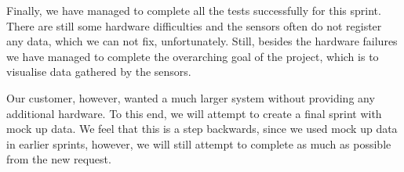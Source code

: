 \documentclass[../document]{subfiles}
\begin{document}
Finally, we have managed to complete all the tests successfully for this sprint. There are still some hardware difficulties and the sensors often do not register any data, which we can not fix, unfortunately. Still, besides the hardware failures we have managed to complete the overarching goal of the project, which is to visualise data gathered by the sensors. 

Our customer, however, wanted a much larger system without providing any additional hardware. To this end, we will attempt to create a final sprint with mock up data. We feel that this is a step backwards, since we used mock up data in earlier sprints, however, we will still attempt to complete as much as possible from the new request.
\end{document}
